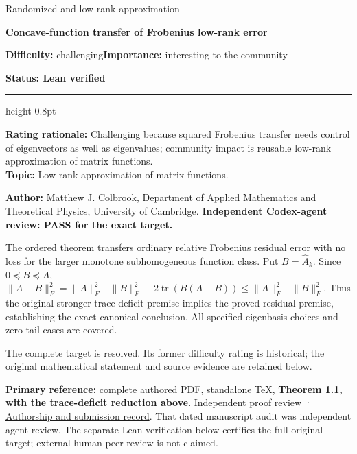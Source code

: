\documentclass[11pt,a4paper]{article}
\makeatletter
\renewcommand{\subsection}{\Needspace{4\baselineskip}\@startsection{subsection}{2}{0pt}{9pt plus 1pt minus 1pt}{3pt}{\sffamily\bfseries\normalsize\color{ink}}}
\makeatother
\begin{document}
{\sffamily\small\color{muted}Randomized and low-rank approximation\par}
\vspace{3pt}
{\raggedright{}\sffamily\bfseries\fontsize{21}{24}\selectfont\color{ink}Concave-function
transfer of Frobenius low-rank error\par}
\vspace{7pt}
{\sffamily\small\textbf{Difficulty:} challenging\quad\textbf{Importance:} interesting
to the community\par}
{\sffamily\small\bfseries\color{accent}Status: Lean verified\par}
\vspace{4pt}
{\color{accent}\hrule height 0.8pt}
\vspace{6pt}
\textbf{Rating rationale:} Challenging because squared Frobenius
transfer needs control of eigenvectors as well as eigenvalues; community
impact is reusable low-rank approximation of matrix functions.\\
\textbf{Topic:} Low-rank approximation of matrix functions.

\subsection{Resolution --- 2026-09-11}\label{resolution-2026-09-11}

\textbf{Author:} Matthew J. Colbrook, Department of Applied Mathematics
and Theoretical Physics, University of Cambridge. \textbf{Independent
Codex-agent review: PASS for the exact target.}

The ordered theorem transfers ordinary relative Frobenius residual error
with no loss for the larger monotone subhomogeneous function class. Put
\(B=\widehat A_k\). Since \(0\preceq B\preceq A\),
\(\|A-B\|_F^2=\|A\|_F^2-\|B\|_F^2-2\mathop{\mathrm{tr}}\nolimits(B(A-B))\le\|A\|_F^2-\|B\|_F^2\).
Thus the original stronger trace-deficit premise implies the proved
residual premise, establishing the exact canonical conclusion. All
specified eigenbasis choices and zero-tail cases are covered.

The complete target is resolved. Its former difficulty rating is
historical; the original mathematical statement and source evidence are
retained below.

\textbf{Primary reference:}
\href{https://github.com/ajt60gaibb/OpenProblemsInNLA/blob/main/references/colbrook-transfer-2026-09-11/manuscripts/02_frobenius_function_transfer.pdf}{complete
authored PDF},
\href{https://github.com/ajt60gaibb/OpenProblemsInNLA/blob/main/references/colbrook-transfer-2026-09-11/manuscripts/02_frobenius_function_transfer.tex}{standalone
TeX}, \textbf{Theorem 1.1, with the trace-deficit reduction above}.
\href{https://github.com/ajt60gaibb/OpenProblemsInNLA/blob/main/references/colbrook-transfer-2026-09-11/verification/reviews/RA-09-review.md}{Independent
proof review} ·
\href{https://github.com/ajt60gaibb/OpenProblemsInNLA/blob/main/references/colbrook-transfer-2026-09-11/README.md}{Authorship
and submission record}. That dated manuscript audit was independent
agent review. The separate Lean verification below certifies the full
original target; external human peer review is not claimed.
\end{document}
